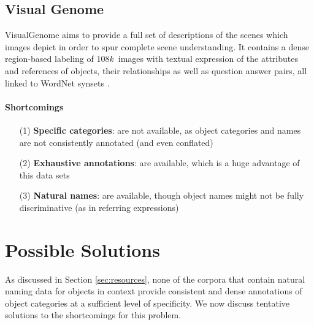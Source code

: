 \documentclass[runningheads]{llncs}
\newcommand{\vgenome}{VisualGenome\xspace}
\begin{document}

\subsection{Visual Genome}

\vgenome \cite{krishna2016visualgenome} aims to provide a full set of descriptions of the scenes which images depict in order to spur complete scene understanding. 
It contains a dense region-based labeling of $108k$~images with textual expression of the attributes and references of objects, their relationships as well as question answer pairs, all linked to WordNet synsets \cite[see below]{fellbaum1998wordnet}. 

\paragraph{Shortcomings}


\begin{itemize}
     		\item[(1)] \textbf{Specific categories}: are not available, as object categories and names are not consistently annotated (and even conflated)
				\item[(2)] \textbf{Exhaustive annotations}: are available, which is a huge advantage of this data sets
		   \item[(3)] \textbf{Natural names}: are available, though object names might not be fully discriminative (as in referring expressions)

\end{itemize}

\section{Possible Solutions}

As discussed in Section \ref{sec:resources}, none of the corpora that contain natural naming data for objects in context provide consistent and dense annotations of object categories at a sufficient level of specificity. We now discuss tentative solutions to the shortcomings for this problem.
\end{document}
